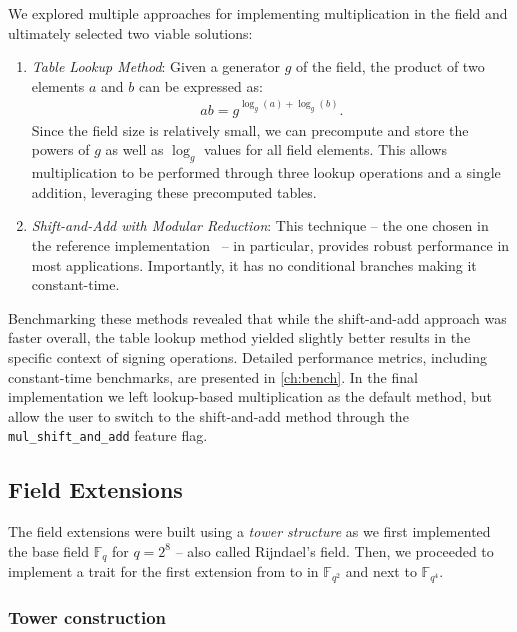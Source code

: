\documentclass[11pt]{report}
\theoremstyle{definition}
\theoremstyle{plain}
\begin{document}
We explored multiple approaches for implementing multiplication in the field and ultimately selected two viable solutions:

\begin{enumerate}
  \item \textit{Table Lookup Method}: Given a generator $g$ of the field, the product of two elements $a$ and $b$ can be expressed as:
        \begin{align*}
          ab = g^{\log_g(a) + \log_g(b)}.
        \end{align*}
        Since the field size is relatively small, we can precompute and store the powers of $g$ as well as $\log_g$ values for all field elements. This allows multiplication to be performed through three lookup operations and a single addition, leveraging these precomputed tables.

  \item \textit{Shift-and-Add with Modular Reduction}: This technique -- the one chosen in the reference implementation~\cite{aguilarsyndrome11} -- in particular, provides robust performance in most applications. Importantly, it has no conditional branches making it constant-time.
\end{enumerate}

Benchmarking these methods revealed that while the shift-and-add approach was faster overall, the table lookup method yielded slightly better results in the specific context of signing operations. Detailed performance metrics, including constant-time benchmarks, are presented in \autoref{ch:bench}. In the final implementation we left lookup-based multiplication as the default method, but allow the user to switch to the shift-and-add method through the \texttt{mul\_shift\_and\_add} feature flag.

\subsection{Field Extensions}\label{sub:field_extensions}
The field extensions were built using a \textit{tower structure} as we first implemented the base field $\mathbb{F}_{q}$ for $q=2^8$ -- also called Rijndael's field. Then, we proceeded to implement a trait for the first extension from  to \rust{[u8; 2]} in $\mathbb{F}_{q^2}$ and next to $\mathbb{F}_{q^4}$.

\subsubsection{Tower construction}
\end{document}

